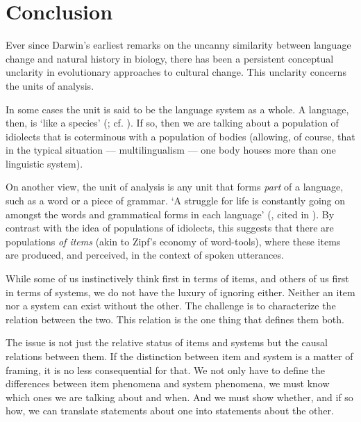 \chapter{Conclusion}



Ever since Darwin's earliest remarks on the uncanny similarity between 
language change and natural history in biology, there has been a 
persistent conceptual unclarity in evolutionary approaches to cultural 
change. This unclarity concerns the units of analysis. 



In some cases the unit is said to be the language system as a whole. A 
language, then, is \textquoteleft like a species' (\citealt[60]{darwin_descent_1871}; cf. \citealt[192--194]{mufwene_ecology_2001}). If so, then we are talking about a population 
of idiolects that is coterminous with a population of bodies (allowing, 
of course, that in the typical situation --- multilingualism --- one body houses 
more than one linguistic system). 



On another view, the unit of analysis is any unit that forms \textit{part} of a language, such as a word or a piece of grammar. \textquoteleft A struggle 
for life is constantly going on amongst the words and grammatical forms 
in each language' (\citealt{muller_darwinism_1870}, cited in \citealt[60]{darwin_descent_1871}). By
contrast with the idea of populations of idiolects, this suggests that 
there are populations \textit{of items }(akin to Zipf's economy of 
word-tools), where these items are produced, and perceived, in the 
context of spoken utterances. 



While some of us instinctively think first in terms of items, and others 
of us first in terms of systems, we do not have the luxury of ignoring either. 
Neither an item nor a system can exist without the other. The challenge 
is to characterize the relation between the two. This relation is the 
one thing that defines them both. 



The issue is not just the relative status of items and systems but the 
causal relations between them. If the distinction 
between item and system is a matter of framing, it is no less 
consequential for that. We not only have to define the differences 
between item phenomena and system phenomena, we must know which ones we 
are talking about and when. And we must show whether, and if so how, we 
can translate statements about one into statements about the other. 

